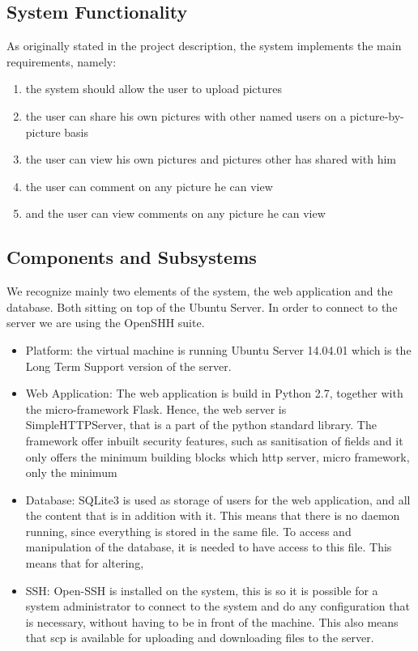 \documentclass{article}
\begin{document}
\subsection{System Functionality}

As originally stated in the project description, the system implements the main requirements, namely:

\begin{enumerate}
\item the system should allow the user to upload pictures 
\item the user can share his own pictures with other named users on a picture-by-picture basis
\item the user can view his own pictures and pictures other has shared with him
\item the user can comment on any picture he can view
\item and the user can view comments on any picture he can view  
\end{enumerate}


\subsection{Components and Subsystems}

We recognize mainly two elements of the system, the web application  and the database. Both sitting on top of the Ubuntu Server. In order to connect to the server we are using the OpenSHH suite.
  
\begin{itemize}
\item Platform: the virtual machine is running Ubuntu Server 14.04.01 which is the Long Term Support version of the server.


\item Web Application: The web application is build in Python 2.7, together with the micro-framework Flask. Hence, the web server is \\SimpleHTTPServer, that is a part of the python standard library. The framework offer inbuilt security features, such as sanitisation of fields and it only offers the minimum building blocks which http server, micro framework, only the minimum 

\item Database: SQLite3 is used as storage of users for the web application, and all the content that is in addition with it. This means that there is no daemon running, since everything is stored in the same file. To access and manipulation of the database, it is needed to have access to this file. This means that for altering, 
\end{itemize}
\begin{itemize}



\item SSH: Open-SSH is installed on the system, this is so it is possible for a system administrator to connect to the system and do any configuration that is necessary, without having to be in front of the machine. This also means that scp is available for uploading and downloading files to the server. 
\end{itemize}
\end{document}
